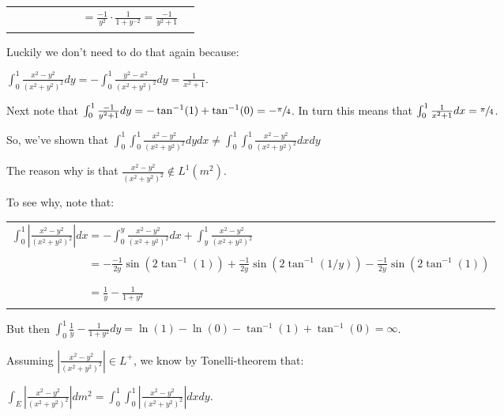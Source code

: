 \documentclass{book}
\newcommand{\exPP}{%
   \color{RedViolet}%
   \fontsize{12}{14}\selectfont%
}
\newenvironment{myIndent}{%
   \begin{adjustwidth}{2.5em}{0em}%
}{%
   \end{adjustwidth}%
}
\newcommand{\retTwo}{\hfill\bigbreak}
\begin{document}
\begin{enumerate}
\begin{myIndent}
{\begin{tabular}{l l}
			$\phantom{\int_0^1 \frac{x^2 - y^2}{(x^2 + y^2)^2}dx} = \frac{-1}{y^2} \cdot \frac{1}{1 + y^{-2}} = \frac{-1}{y^2 + 1}$
		\end{tabular} \retTwo\par}

		Luckily we don't need to do that again because:
		
		{\centering $\int_0^1 \frac{x^2 - y^2}{(x^2 + y^2)^2}dy = -\int_0^1 \frac{y^2 - x^2}{(x^2 + y^2)^2}dy = \frac{1}{x^2 + 1}$.\retTwo\par}

		Next note that $\int_0^1 \frac{-1}{y^2 + 1}dy = -\tan^{-1}(1) + \tan^{-1}(0) = -\sfrac{\pi}{4}$. In turn this means that $\int_0^1 \frac{1}{x^2 + 1}dx = \sfrac{\pi}{4}$.\retTwo

		So, we've shown that $\int_0^1 \int_0^1 \frac{x^2 - y^2}{(x^2 + y^2)^2}dydx \neq \int_0^1 \int_0^1 \frac{x^2 - y^2}{(x^2 + y^2)^2}dxdy$\retTwo

		The reason why is that $\frac{x^2 - y^2}{(x^2 + y^2)^2} \notin L^1(m^2)$.\newpage
		
		To see why, note that:
		
		{\centering\exPP
		\begin{tabular}{l}
			$\int_0^1 \left|\frac{x^2 - y^2}{(x^2 + y^2)^2}\right|dx = -\int_0^y \frac{x^2 - y^2}{(x^2 + y^2)^2}dx + \int_y^1\frac{x^2 - y^2}{(x^2 + y^2)^2}$\\ [8pt]

			$\phantom{\int_0^1 \left|\frac{x^2 - y^2}{(x^2 + y^2)^2}\right|dx} = -\frac{-1}{2y}\sin(2\tan^{-1}(1)) + \frac{-1}{2y}\sin(2\tan^{-1}(1/y)) -\frac{-1}{2y}\sin(2\tan^{-1}(1))$\\ [8pt]

			$\phantom{\int_0^1 \left|\frac{x^2 - y^2}{(x^2 + y^2)^2}\right|dx} = \frac{1}{y} - \frac{1}{1 + y^2}$\\ [8pt]
		\end{tabular}\retTwo\par}

		But then $\int_0^1 \frac{1}{y} - \frac{1}{1 + y^2}dy = \ln(1) - \ln(0) - \tan^{-1}(1) + \tan^{-1}(0) = \infty$.\retTwo

		Assuming $\left|\frac{x^2 - y^2}{(x^2 + y^2)^2}\right| \in L^+$, we know by Tonelli-theorem that:
		
		{\centering $\int_E \left|\frac{x^2 - y^2}{(x^2 + y^2)^2}\right|dm^2 = \int_0^1\int_0^1\left|\frac{x^2 - y^2}{(x^2 + y^2)^2}\right|dxdy$.\retTwo\par}


\end{myIndent}
\end{enumerate}
\end{document}
